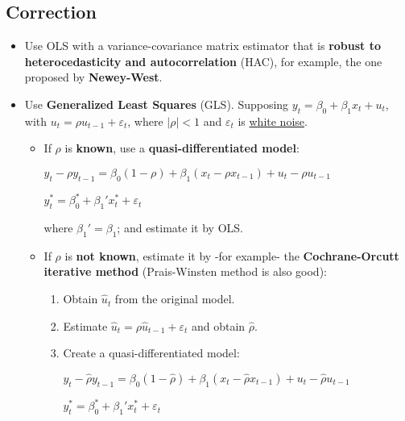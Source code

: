 \documentclass[10pt, a4paper, landscape]{article}
\begin{document}
\begin{multicols}{3}
		\subsection*{Correction}
		
		\begin{itemize}[leftmargin=*]
			\item Use OLS with a variance-covariance matrix estimator that is \textbf{robust to heterocedasticity and autocorrelation} (HAC), for example, the one proposed by \textbf{Newey-West}.
			\item Use \textbf{Generalized Least Squares} (GLS). Supposing $y_{t} = \beta_{0} + \beta_{1} x_{t} + u_{t}$, with $u_{t} = \rho u_{t - 1}+ \varepsilon_{t}$, where $\lvert \rho \rvert < 1$ and $\varepsilon_{t}$ is \underline{white noise}.
			
			\begin{itemize}[leftmargin=*]
				\item If $\rho$ is \textbf{known}, use a \textbf{quasi-differentiated model}:
			
				\begin{center}
					$y_{t} - \rho y_{t - 1}= \beta_{0} (1 - \rho) + \beta_{1} (x_{t} - \rho x_{t - 1}) + u_{t} - \rho u_{t - 1}$
					
					$y_{t}^{*} = \beta_{0}^{*} + \beta_{1}' x_{t}^{*} + \varepsilon_{t}$
				\end{center}
				
				where $\beta_{1}' = \beta_{1}$; and estimate it by OLS.
				
				\item If $\rho$ is \textbf{not known}, estimate it by -for example- the \textbf{Cochrane-Orcutt iterative method} (Prais-Winsten method is also good):
				
				\begin{enumerate}[leftmargin=*]
					\item Obtain $\hat{u}_{t}$ from the original model.
					\item Estimate $\hat{u}_{t} = \rho \hat{u}_{t-1} + \varepsilon_{t}$ and obtain $\hat{\rho}$.
					\item Create a quasi-differentiated model:
					
					\begin{center}
						$y_{t} - \hat{\rho}y_{t - 1} = \beta_{0} (1 - \hat{\rho}) + \beta_{1} (x_{t} - \hat{\rho} x_{t - 1}) + u_{t} - \hat{\rho}u_{t - 1}$
						
						$y_{t}^{*} = \beta_{0}^{*} + \beta_{1}' x_{t}^{*} + \varepsilon_{t}$
					\end{center}
					

\end{enumerate}
\end{itemize}
\end{itemize}
\end{multicols}
\end{document}

